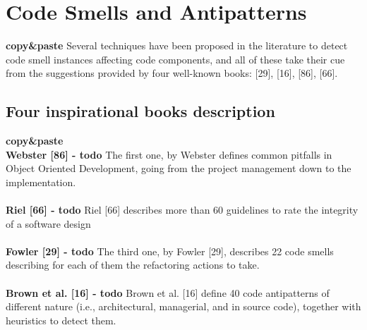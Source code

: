\section{Code Smells and Antipatterns}
\textbf{copy\&paste}
Several techniques have been proposed in the literature to detect code smell instances affecting code components, and all of these take their cue from the suggestions provided by four well-known books: [29], [16], [86], [66].

\subsection{Four inspirational books description}
\textbf{copy\&paste}
\\
\textbf{Webster [86] - todo}
The first one, by Webster \cite{webster1995pitfalls} defines common pitfalls in Object Oriented Development, going from the project management down to the implementation.
\\
\\
\textbf{Riel [66] - todo}
Riel [66] describes more than 60 guidelines to rate the integrity of a software design
\\
\\
\textbf{Fowler [29] - todo}
The third one, by Fowler [29], describes 22 code smells describing for each of them the refactoring actions to take. 
\\
\\
\textbf{Brown et al. [16] - todo}
Brown et al. [16] define 40 code antipatterns of different nature (i.e., architectural, managerial, and in source code), together with heuristics to detect them.
\\
\\
